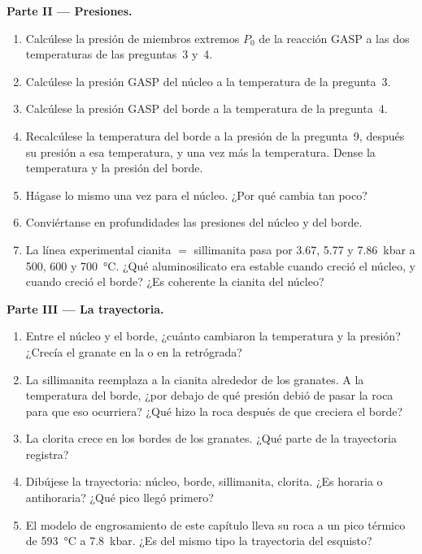 \begin{problem}
\noindent\textbf{Parte II --- Presiones.}
\begin{enumerate}[resume]
\item Calcúlese la presión de miembros extremos $P_0$ de la reacción GASP a las dos temperaturas
de las preguntas~3 y~4.
\item Calcúlese la presión GASP del núcleo a la temperatura de la pregunta~3.
\item Calcúlese la presión GASP del borde a la temperatura de la pregunta~4.
\item Recalcúlese la temperatura del borde a la presión de la pregunta~9, después su
presión a esa temperatura, y una vez más la temperatura. Dense la temperatura y la
presión del borde.
\item Hágase lo mismo una vez para el núcleo. ¿Por qué cambia tan poco?
\item Conviértanse en profundidades las presiones del núcleo y del borde.
\item La línea experimental cianita $=$ sillimanita pasa por 3.67, 5.77 y
\qty{7.86}{kbar} a 500, 600 y \qty{700}{\celsius}. ¿Qué aluminosilicato era estable
cuando creció el núcleo, y cuando creció el borde? ¿Es coherente la cianita del núcleo?
\end{enumerate}

\noindent\textbf{Parte III --- La trayectoria.}
\begin{enumerate}[resume]
\item Entre el núcleo y el borde, ¿cuánto cambiaron la temperatura y la presión?
¿Crecía el granate en la  o en la retrógrada?
\item La sillimanita reemplaza a la cianita alrededor de los granates. A la temperatura del borde,
¿por debajo de qué presión debió de pasar la roca para que eso ocurriera? ¿Qué hizo la roca
después de que creciera el borde?
\item La clorita crece en los bordes de los granates. ¿Qué parte de la trayectoria registra?
\item Dibújese la trayectoria: núcleo, borde, sillimanita, clorita. ¿Es horaria o antihoraria?
¿Qué pico llegó primero?
\item El modelo de engrosamiento de este capítulo lleva su roca a un pico térmico de
\qty{593}{\celsius} a \qty{7.8}{kbar}. ¿Es del mismo tipo la trayectoria del esquisto?
\end{enumerate}


\end{problem}
